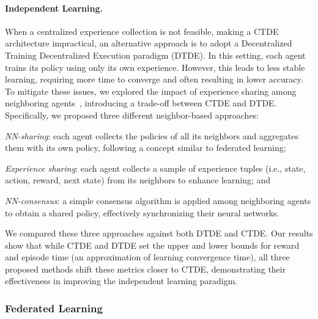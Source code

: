 \documentclass[12pt]{article}
\begin{document}
\paragraph{Independent Learning.}
When a centralized experience collection is not feasible, making a CTDE architecture impractical, 
 an alternative approach is to adopt a Decentralized Training Decentralized Execution paradigm (DTDE). 
% 
In this setting, each agent trains its policy using only its own experience. 
%
However, this leads to less stable learning, requiring more time to converge and often resulting in lower accuracy. 
%
To mitigate these issues, we explored the impact of experience sharing among neighboring 
 agents~\cite{DBLP:conf/sac/MalucelliDAV25}, introducing a trade-off between CTDE and DTDE. 
% 
Specifically, we proposed three different neighbor-based approaches:
 \begin{enumerate*}[label=(\roman*)]
	\item \emph{NN-sharing}: each agent collects the policies of all its neighbors and aggregates them with its own policy, 
	 following a concept similar to federated learning;
	\item \emph{Experience sharing}: each agent collects a sample of experience tuples (i.e., state, action, reward, next state) 
	 from its neighbors to enhance learning; and
	\item \emph{NN-consensus}: a simple consensus algorithm is applied among neighboring agents to obtain a shared policy, 
	 effectively synchronizing their neural networks.
 \end{enumerate*}
%
We compared these three approaches against both DTDE and CTDE. 
%
Our results show that while CTDE and DTDE set the upper and lower bounds for reward and episode time (an approximation of 
 learning convergence time), all three proposed methods shift these metrics closer to CTDE, demonstrating their 
 effectiveness in improving the independent learning paradigm.

\subsubsection{Federated Learning}
\end{document}
